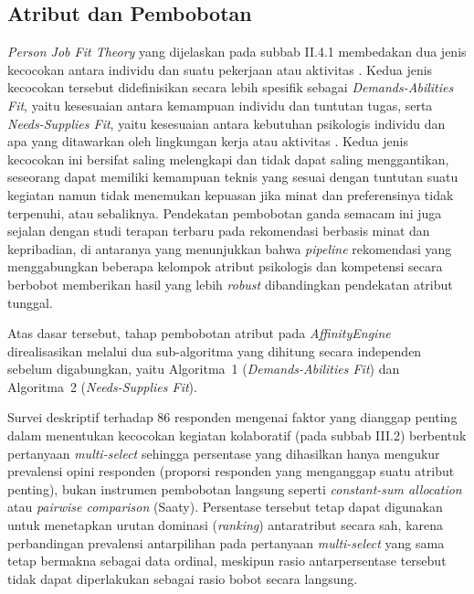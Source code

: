 \subsection{Atribut dan Pembobotan}

\emph{Person Job Fit Theory} yang dijelaskan pada subbab II.4.1 membedakan dua jenis kecocokan antara individu dan suatu pekerjaan atau aktivitas \autocite{kristofbrown2005}. Kedua jenis kecocokan tersebut didefinisikan secara lebih spesifik sebagai \emph{Demands-Abilities Fit}, yaitu kesesuaian antara kemampuan individu dan tuntutan tugas, serta \emph{Needs-Supplies Fit}, yaitu kesesuaian antara kebutuhan psikologis individu dan apa yang ditawarkan oleh lingkungan kerja atau aktivitas \autocite{langgeng2021}. Kedua jenis kecocokan ini bersifat saling melengkapi dan tidak dapat saling menggantikan, seseorang dapat memiliki kemampuan teknis yang sesuai dengan tuntutan suatu kegiatan namun tidak menemukan kepuasan jika minat dan preferensinya tidak terpenuhi, atau sebaliknya. Pendekatan pembobotan ganda semacam ini juga sejalan dengan studi terapan terbaru pada rekomendasi berbasis minat dan kepribadian, di antaranya \textcite{sarsenbay2025} yang menunjukkan bahwa \emph{pipeline} rekomendasi yang menggabungkan beberapa kelompok atribut psikologis dan kompetensi secara berbobot memberikan hasil yang lebih \emph{robust} dibandingkan pendekatan atribut tunggal.

Atas dasar tersebut, tahap pembobotan atribut pada \emph{AffinityEngine} direalisasikan melalui dua sub-algoritma yang dihitung secara independen sebelum digabungkan, yaitu Algoritma~1 (\emph{Demands-Abilities Fit}) dan Algoritma~2 (\emph{Needs-Supplies Fit}).

Survei deskriptif terhadap 86 responden mengenai faktor yang dianggap penting dalam menentukan kecocokan kegiatan kolaboratif (pada subbab III.2) berbentuk pertanyaan \emph{multi-select} sehingga persentase yang dihasilkan hanya mengukur prevalensi opini responden (proporsi responden yang menganggap suatu atribut penting), bukan instrumen pembobotan langsung seperti \emph{constant-sum allocation} atau \emph{pairwise comparison} (Saaty). Persentase tersebut tetap dapat digunakan untuk menetapkan urutan dominasi (\emph{ranking}) antaratribut secara sah, karena perbandingan prevalensi antarpilihan pada pertanyaan \emph{multi-select} yang sama tetap bermakna sebagai data ordinal, meskipun rasio antarpersentase tersebut tidak dapat diperlakukan sebagai rasio bobot secara langsung.

